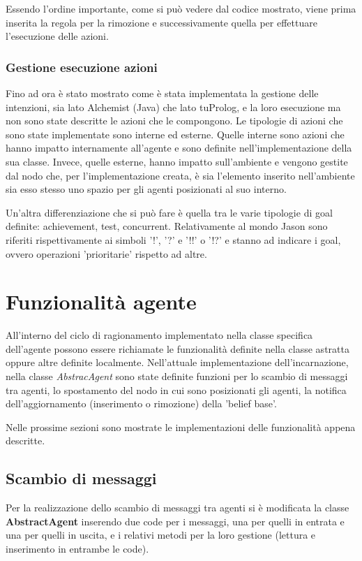 \documentclass[12pt,a4paper,openright,twoside]{report}
\begin{document}
Essendo l'ordine importante, come si pu\`o vedere dal codice mostrato, viene prima inserita la regola per la rimozione e successivamente quella per effettuare l'esecuzione delle azioni.

\subsubsection{Gestione esecuzione azioni}
Fino ad ora \`e stato mostrato come \`e stata implementata la gestione delle intenzioni, sia lato Alchemist (Java) che lato tuProlog, e la loro esecuzione ma non sono state descritte le azioni che le compongono.
Le tipologie di azioni che sono state implementate sono interne ed esterne. Quelle interne sono azioni che hanno impatto internamente all'agente e sono definite nell'implementazione della sua classe. Invece, quelle esterne, hanno impatto sull'ambiente e vengono gestite dal nodo che, per l'implementazione creata, \`e sia l'elemento inserito nell'ambiente sia esso stesso uno spazio per gli agenti posizionati al suo interno.

Un'altra differenziazione che si pu\`o fare \`e quella tra le varie tipologie di goal definite: achievement, test, concurrent. Relativamente al mondo Jason sono riferiti rispettivamente ai simboli '!', '?' e '!!' o '!?' e stanno ad indicare i goal, ovvero operazioni 'prioritarie' rispetto ad altre.

\section{Funzionalit\`a agente}
All'interno del ciclo di ragionamento implementato nella classe specifica dell'agente possono essere richiamate le funzionalit\`a definite nella classe astratta oppure altre definite localmente.
Nell'attuale implementazione dell'incarnazione, nella classe \textit{AbstracAgent} sono state definite funzioni per lo scambio di messaggi tra agenti, lo spostamento del nodo in cui sono posizionati gli agenti, la notifica dell'aggiornamento (inserimento o rimozione) della 'belief base'.

Nelle prossime sezioni sono mostrate le implementazioni delle funzionalit\`a appena descritte.

\subsection{Scambio di messaggi}
Per la realizzazione dello scambio di messaggi tra agenti si \`e modificata la classe \textbf{AbstractAgent} inserendo due code per i messaggi, una per quelli in entrata e una per quelli in uscita, e i relativi metodi per la loro gestione (lettura e inserimento in entrambe le code).
\end{document}
